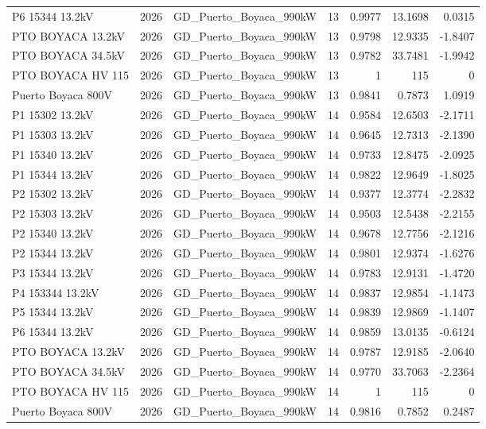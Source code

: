\documentclass[11pt,a4paper]{article}
\begin{document}
\begin{longtable}{llllrrr}
P6 15344 13.2kV & 2026 & GD\_Puerto\_Boyaca\_990kW & 13 & 0.9977 & 13.1698 & 0.0315 \\
PTO BOYACA 13.2kV & 2026 & GD\_Puerto\_Boyaca\_990kW & 13 & 0.9798 & 12.9335 & -1.8407 \\
PTO BOYACA 34.5kV & 2026 & GD\_Puerto\_Boyaca\_990kW & 13 & 0.9782 & 33.7481 & -1.9942 \\
PTO BOYACA HV 115 & 2026 & GD\_Puerto\_Boyaca\_990kW & 13 & 1 & 115 & 0 \\
Puerto Boyaca 800V & 2026 & GD\_Puerto\_Boyaca\_990kW & 13 & 0.9841 & 0.7873 & 1.0919 \\
P1 15302 13.2kV & 2026 & GD\_Puerto\_Boyaca\_990kW & 14 & 0.9584 & 12.6503 & -2.1711 \\
P1 15303 13.2kV & 2026 & GD\_Puerto\_Boyaca\_990kW & 14 & 0.9645 & 12.7313 & -2.1390 \\
P1 15340 13.2kV & 2026 & GD\_Puerto\_Boyaca\_990kW & 14 & 0.9733 & 12.8475 & -2.0925 \\
P1 15344 13.2kV & 2026 & GD\_Puerto\_Boyaca\_990kW & 14 & 0.9822 & 12.9649 & -1.8025 \\
P2 15302 13.2kV & 2026 & GD\_Puerto\_Boyaca\_990kW & 14 & 0.9377 & 12.3774 & -2.2832 \\
P2 15303 13.2kV & 2026 & GD\_Puerto\_Boyaca\_990kW & 14 & 0.9503 & 12.5438 & -2.2155 \\
P2 15340 13.2kV & 2026 & GD\_Puerto\_Boyaca\_990kW & 14 & 0.9678 & 12.7756 & -2.1216 \\
P2 15344 13.2kV & 2026 & GD\_Puerto\_Boyaca\_990kW & 14 & 0.9801 & 12.9374 & -1.6276 \\
P3 15344 13.2kV & 2026 & GD\_Puerto\_Boyaca\_990kW & 14 & 0.9783 & 12.9131 & -1.4720 \\
P4 153344 13.2kV & 2026 & GD\_Puerto\_Boyaca\_990kW & 14 & 0.9837 & 12.9854 & -1.1473 \\
P5 15344 13.2kV & 2026 & GD\_Puerto\_Boyaca\_990kW & 14 & 0.9839 & 12.9869 & -1.1407 \\
P6 15344 13.2kV & 2026 & GD\_Puerto\_Boyaca\_990kW & 14 & 0.9859 & 13.0135 & -0.6124 \\
PTO BOYACA 13.2kV & 2026 & GD\_Puerto\_Boyaca\_990kW & 14 & 0.9787 & 12.9185 & -2.0640 \\
PTO BOYACA 34.5kV & 2026 & GD\_Puerto\_Boyaca\_990kW & 14 & 0.9770 & 33.7063 & -2.2364 \\
PTO BOYACA HV 115 & 2026 & GD\_Puerto\_Boyaca\_990kW & 14 & 1 & 115 & 0 \\
Puerto Boyaca 800V & 2026 & GD\_Puerto\_Boyaca\_990kW & 14 & 0.9816 & 0.7852 & 0.2487 \\

\end{longtable}
\end{document}
